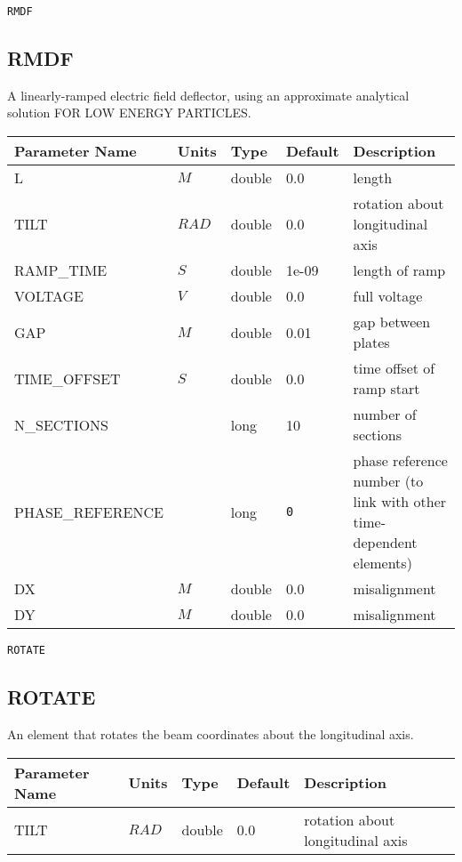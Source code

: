 \begin{latexonly}
\newpage
\begin{center}{\Large\verb|RMDF|}\end{center}
\end{latexonly}\subsection{RMDF}
A linearly-ramped electric field deflector, using an approximate analytical solution FOR LOW ENERGY PARTICLES.
\\
\begin{tabular}{|l|l|l|l|p{\descwidth}|} \hline
Parameter Name & Units & Type & Default & Description \\ \hline 
L & $M$ & double &  0.0 & length  \\ \hline 
TILT & $RAD$ & double &  0.0 & rotation about longitudinal axis  \\ \hline 
RAMP\_TIME & $S$ & double &   1e-09 & length of ramp  \\ \hline 
VOLTAGE & $V$ & double &  0.0 & full voltage  \\ \hline 
GAP & $M$ & double &   0.01 & gap between plates  \\ \hline 
TIME\_OFFSET & $S$ & double &  0.0 & time offset of ramp start  \\ \hline 
N\_SECTIONS &  & long &   10              & number of sections  \\ \hline 
PHASE\_REFERENCE &  & long &  \verb|0| & phase reference number (to link with other time-dependent elements)  \\ \hline 
DX & $M$ & double &  0.0 & misalignment  \\ \hline 
DY & $M$ & double &  0.0 & misalignment  \\ \hline 
\end{tabular}

\begin{latexonly}
\newpage
\begin{center}{\Large\verb|ROTATE|}\end{center}
\end{latexonly}\subsection{ROTATE}
An element that rotates the beam coordinates about the longitudinal axis.
\\
\begin{tabular}{|l|l|l|l|p{\descwidth}|} \hline
Parameter Name & Units & Type & Default & Description \\ \hline 
TILT & $RAD$ & double &  0.0 & rotation about longitudinal axis  \\ \hline 
\end{tabular}

